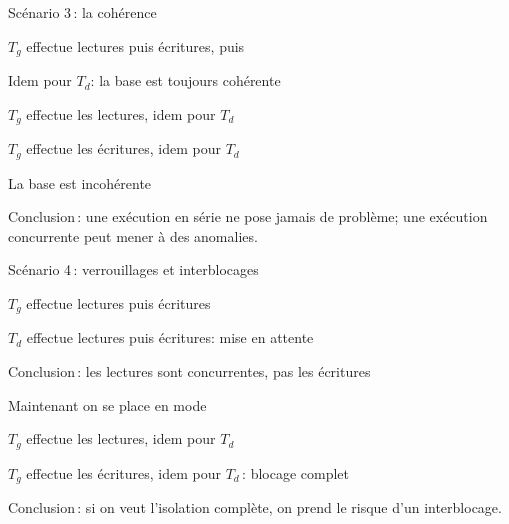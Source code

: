 \begin{frame}{Scénario 3\,: la cohérence}

\vfill 

\begin{redbullet}
  \item $T_g$ effectue lectures puis écritures, puis 
  \item Idem pour  $T_d$: la base est toujours cohérente
  \item $T_g$ effectue les lectures, idem pour  $T_d$
  \item $T_g$ effectue les écritures, idem pour  $T_d$
  \item \alert{La base est incohérente}
\end{redbullet}

\vfill

\alert{Conclusion}\,: une exécution \alert{en série} ne pose jamais de problème;
une exécution \alert{concurrente} peut mener à des anomalies.
\end{frame}


\begin{frame}{Scénario 4\,: verrouillages et interblocages}

\begin{redbullet}
  \item $T_g$ effectue lectures puis écritures
  \item  $T_d$ effectue lectures puis écritures: mise en attente
\end{redbullet}

\alert{Conclusion}\,: les lectures sont concurrentes, pas les écritures

\vfill

Maintenant on se place en mode 

\begin{redbullet}
  \item $T_g$ effectue les lectures, idem pour  $T_d$
  \item $T_g$ effectue les écritures, idem pour  $T_d$\,: blocage complet
\end{redbullet}

\vfill

\alert{Conclusion}\,: si on veut l'isolation complète, on prend le risque d'un interblocage.

\end{frame}


